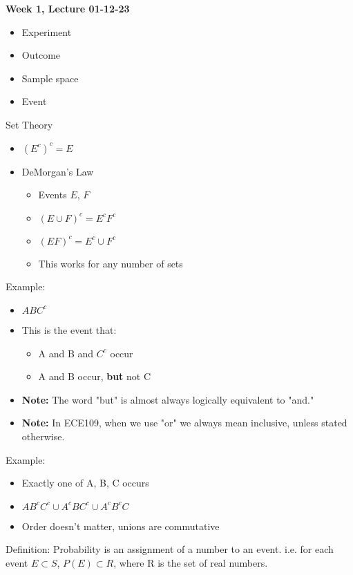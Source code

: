 \documentclass[10pt]{article}
\begin{document}
\begin{center}
	\Large \textbf{Week 1, Lecture 01-12-23}
\end{center}
\normalsize
\begin{itemize}
    \item Experiment
    \item Outcome
    \item Sample space
    \item Event
\end{itemize}
Set Theory 
\begin{itemize}
    \item $(E^c)^c = E$
    \item DeMorgan's Law
        \begin{itemize}
            \item Events $E$, $F$
            \item $(E \cup F)^c = E^cF^c$
            \item $(EF)^c = E^c \cup F^c$
            \item This works for any number of sets
        \end{itemize}
\end{itemize}
Example:
\begin{itemize}
    \item $ABC^c$
    \item This is the event that:
        \begin{itemize}
            \item A and B and $C^c$ occur
            \item A and B occur, \textbf{but} not C
        \end{itemize}
    \item \textbf{Note:} The word "but" is almost always logically equivalent to "and."
    \item \textbf{Note:} In ECE109, when we use "or" we always mean inclusive,
        unless stated otherwise.
\end{itemize}
Example:
\begin{itemize}
    \item Exactly one of A, B, C occurs
    \item $AB^cC^c \cup A^cBC^c \cup A^cB^cC$
    \item Order doesn't matter, unions are commutative
\end{itemize}

Definition: Probability is an assignment of a number to an event. i.e. for each
event $E \subset S$, $P(E) \subset R$, where R is the set of real numbers.
\end{document}
